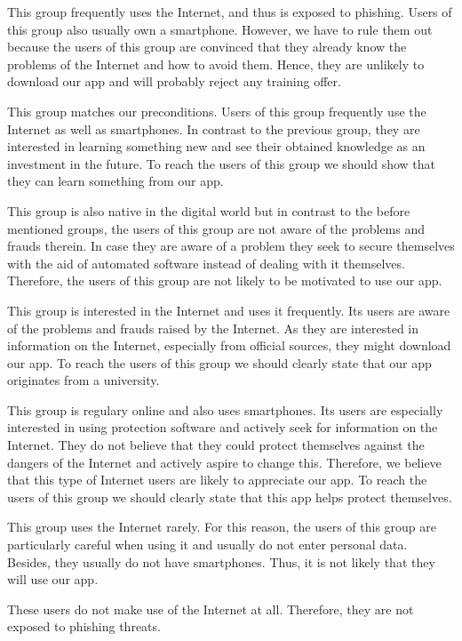 \begin{description}[leftmargin=0cm]
\item[Digital Souver\"{a}ne:] This group frequently uses the Internet, and thus is exposed to phishing. Users of this group also usually own a smartphone. However, we have to rule them out because the users of this group are convinced that they already know the problems of the Internet and how to avoid them. Hence, they are unlikely to download our app and  will probably reject any training offer.
\item[Effizienzorientierte Performer:] This group matches our preconditions.
Users of this group frequently use the Internet as well as smartphones. In contrast to the previous group, they are interested in learning something new and see their obtained knowledge as an investment in the future. To reach the users of this group we should show that they can learn something from our app.
\item[Unbek\"{u}mmerte Hedonisten:] This group is also native in the digital world but in contrast to the before mentioned groups, the users of this group are not aware of the problems and frauds therein. In case they are aware of a problem they seek to secure themselves with the aid of automated software instead of dealing with it themselves. Therefore, the users of this group are not likely to be motivated to use our app.
\item[Postmaterielle Skeptiker:] This group is interested in the Internet and uses it frequently. Its users are aware of the problems and frauds raised by the Internet. As they are interested in information on the Internet, especially from official sources, they might download our app. To reach the users of this group we should clearly state that our app originates from a university.
\item[Verantwortungsbedachte Etablierte:] This group is regulary online and also uses smartphones. Its users are especially interested in using protection software and actively seek for information on the Internet. They do not believe that they could protect themselves against the dangers of the Internet and actively aspire to change this. Therefore, we believe that this type of Internet users are likely to appreciate our app. To reach the users of this group we should clearly state that this app helps protect themselves.
\item[Ordnungsfordernde Internet-Laien:] This group uses the Internet rarely. For this reason, the users of this group are particularly careful when using it and usually do not enter personal data. Besides, they usually do not have smartphones. Thus, it is not likely that they will use our app. 
\item[Internetferne Verunsicherte:] These users do not make use of the Internet at all. Therefore, they are not exposed to phishing threats.
\end{description}

